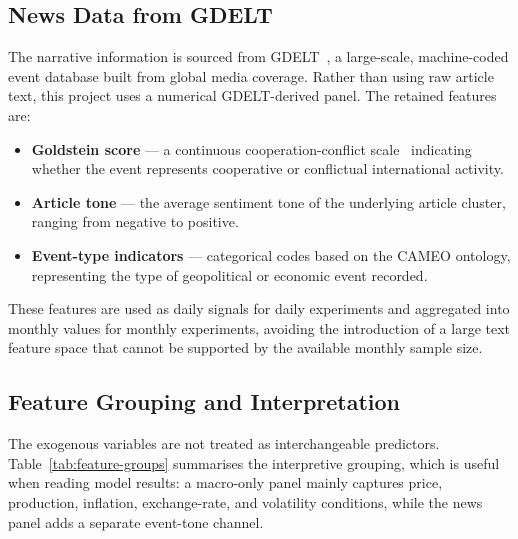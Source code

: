 \documentclass[12pt,a4paper]{article}
\begin{document}
\subsection{News Data from GDELT}

The narrative information is sourced from GDELT~\citep{leetaru2013gdelt}, a large-scale, machine-coded event database built from global media coverage. Rather than using raw article text, this project uses a numerical GDELT-derived panel. The retained features are:

\begin{itemize}[leftmargin=*]
  \item \textbf{Goldstein score} — a continuous cooperation-conflict scale~\citep{goldstein1992conflict} indicating whether the event represents cooperative or conflictual international activity.
  \item \textbf{Article tone} — the average sentiment tone of the underlying article cluster, ranging from negative to positive.
  \item \textbf{Event-type indicators} — categorical codes based on the CAMEO ontology, representing the type of geopolitical or economic event recorded.
\end{itemize}

These features are used as daily signals for daily experiments and aggregated into monthly values for monthly experiments, avoiding the introduction of a large text feature space that cannot be supported by the available monthly sample size.

\subsection{Feature Grouping and Interpretation}

The exogenous variables are not treated as interchangeable predictors. Table~\ref{tab:feature-groups} summarises the interpretive grouping, which is useful when reading model results: a macro-only panel mainly captures price, production, inflation, exchange-rate, and volatility conditions, while the news panel adds a separate event-tone channel.
\end{document}
